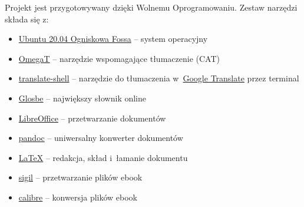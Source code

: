 \documentclass[oneside,polish,11pt,sfheadings]{mwbk}
\begin{document}
Projekt jest przygotowywany dzięki Wolnemu Oprogramowaniu. Zestaw narzędzi składa się z:
\begin{itemize}
\item \href{https://ubuntu.com/}{Ubuntu 20.04 Ogniskowa Fossa} -- system operacyjny
\item \href{https://omegat.org/}{OmegaT} -- narzędzie wspomagające tłumaczenie (CAT)
\item \href{https://github.com/soimort/translate-shell}{translate-shell} -- narzędzie do tłumaczenia w~\href{https://translate.google.pl}{Google Translate} przez terminal 
\item \href{https://glosbe.com/en/pl}{Glosbe} -- największy słownik online
\item \href{https://www.libreoffice.org/}{LibreOffice} -- przetwarzanie dokumentów 
\item \href{http://pandoc.org}{pandoc} -- uniwersalny konwerter dokumentów 
\item \href{https://www.latex-project.org/}{LaTeX} -- redakcja, skład i~łamanie dokumentu
\item \href{https://sigil-ebook.com/}{sigil} -- przetwarzanie plików ebook
\item \href{https://calibre-ebook.com/}{calibre} -- konwersja plików ebook
\end{itemize}




\tableofcontents{}
\end{document}
